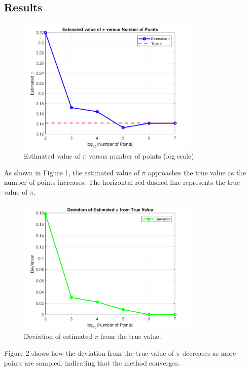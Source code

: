 \documentclass{article}
\begin{document}
\subsection{Results}
\begin{figure}[H]
	\centering
	\includegraphics[width=0.8\textwidth]{Result_Files/pi_estimation_plot.png}
	\caption{Estimated value of $\pi$ versus number of points (log scale).}
	\label{fig:pi_estimation}
\end{figure}

As shown in Figure 1, the estimated value of $\pi$ approaches the true value as the number of points increases. The horizontal red dashed line represents the true value of $\pi$.

\begin{figure}[H]
	\centering
	\includegraphics[width=0.8\textwidth]{Result_Files/pi_deviation_plot.png}
	\caption{Deviation of estimated $\pi$ from the true value.}
	\label{fig:pi_deviation}
\end{figure}

Figure 2 shows how the deviation from the true value of $\pi$ decreases as more points are sampled, indicating that the method converges.
\end{document}
